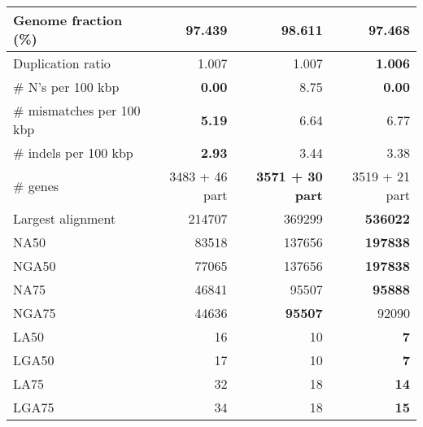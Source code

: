 \documentclass[12pt,a4paper]{article}
\begin{document}
\begin{table}[ht]
\begin{center}
\begin{tabular}{|l*{3}{|r}|}
Genome fraction (\%) & 97.439 & {\bf 98.611} & 97.468 \\ \hline
Duplication ratio & 1.007 & 1.007 & {\bf 1.006} \\ \hline
\# N's per 100 kbp & {\bf 0.00} & 8.75 & {\bf 0.00} \\ \hline
\# mismatches per 100 kbp & {\bf 5.19} & 6.64 & 6.77 \\ \hline
\# indels per 100 kbp & {\bf 2.93} & 3.44 & 3.38 \\ \hline
\# genes & 3483 + 46 part & {\bf 3571 + 30 part} & 3519 + 21 part \\ \hline
Largest alignment & 214707 & 369299 & {\bf 536022} \\ \hline
NA50 & 83518 & 137656 & {\bf 197838} \\ \hline
NGA50 & 77065 & 137656 & {\bf 197838} \\ \hline
NA75 & 46841 & 95507 & {\bf 95888} \\ \hline
NGA75 & 44636 & {\bf 95507} & 92090 \\ \hline
LA50 & 16 & 10 & {\bf 7} \\ \hline
LGA50 & 17 & 10 & {\bf 7} \\ \hline
LA75 & 32 & 18 & {\bf 14} \\ \hline
LGA75 & 34 & 18 & {\bf 15} \\ \hline
\end{tabular}
\end{center}
\end{table}
\end{document}

